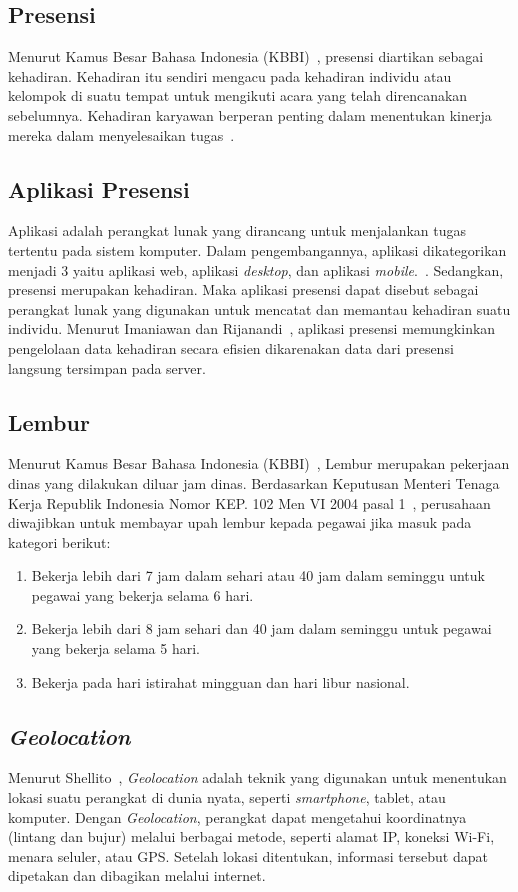 \subsection{Presensi}
Menurut Kamus Besar Bahasa Indonesia (KBBI)~\cite{kbbionline}, presensi diartikan sebagai kehadiran. Kehadiran itu sendiri mengacu pada kehadiran individu atau kelompok di suatu tempat untuk mengikuti acara yang telah direncanakan sebelumnya. Kehadiran karyawan berperan penting dalam menentukan kinerja mereka dalam menyelesaikan tugas~\cite{narulita2024buku}.

\subsection{Aplikasi Presensi}
Aplikasi adalah perangkat lunak yang dirancang untuk menjalankan tugas tertentu pada sistem komputer. Dalam pengembangannya, aplikasi dikategorikan menjadi 3 yaitu aplikasi web, aplikasi \textit{desktop}, dan aplikasi \textit{mobile}.~\cite{pane2020membangun}. Sedangkan, presensi merupakan kehadiran. Maka aplikasi presensi dapat disebut sebagai perangkat lunak yang digunakan untuk mencatat dan memantau kehadiran suatu individu. Menurut Imaniawan dan Rijanandi~\cite{imaniawan2023presensi}, aplikasi presensi memungkinkan pengelolaan data kehadiran secara efisien dikarenakan data dari presensi langsung tersimpan pada server.

\subsection{Lembur}
Menurut Kamus Besar Bahasa Indonesia (KBBI)~\cite{kbbionline}, Lembur merupakan pekerjaan dinas yang dilakukan diluar jam dinas. Berdasarkan Keputusan Menteri Tenaga Kerja Republik Indonesia Nomor KEP. 102 Men VI 2004 pasal 1~\cite{menteri2014peraturan}, perusahaan diwajibkan untuk membayar upah lembur kepada pegawai jika masuk pada kategori berikut:
\begin{enumerate}
    \item Bekerja lebih dari 7 jam dalam sehari atau 40 jam dalam seminggu untuk pegawai yang bekerja selama 6 hari.
    \item Bekerja lebih dari 8 jam sehari dan 40 jam dalam seminggu untuk pegawai yang bekerja selama 5 hari.
    \item Bekerja pada hari istirahat mingguan dan hari libur nasional.
\end{enumerate}

\subsection{\textit{Geolocation}}
Menurut Shellito~\cite{introduction2019bradley}, \textit{Geolocation} adalah teknik yang digunakan untuk menentukan lokasi suatu perangkat di dunia nyata, seperti \textit{smartphone}, tablet, atau komputer. Dengan \textit{Geolocation}, perangkat dapat mengetahui koordinatnya (lintang dan bujur) melalui berbagai metode, seperti alamat IP, koneksi Wi-Fi, menara seluler, atau GPS. Setelah lokasi ditentukan, informasi tersebut dapat dipetakan dan dibagikan melalui internet.

